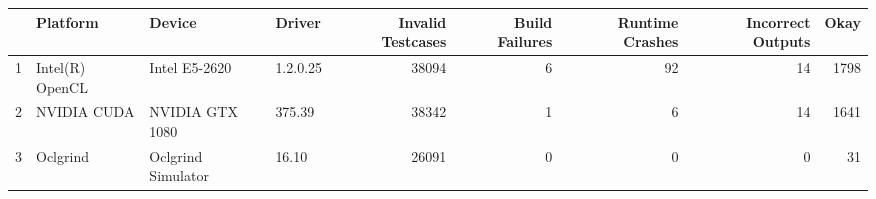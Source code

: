 \begin{tabular}{llllrrrrr}
\toprule
{} &         Platform &              Device &    Driver &  Invalid Testcases &  Build Failures &  Runtime Crashes &  Incorrect Outputs &  Okay \\
\midrule
1 &  Intel(R) OpenCL &       Intel E5-2620 &  1.2.0.25 &              38094 &               6 &               92 &                 14 &  1798 \\
2 &      NVIDIA CUDA &     NVIDIA GTX 1080 &    375.39 &              38342 &               1 &                6 &                 14 &  1641 \\
3 &         Oclgrind &  Oclgrind Simulator &     16.10 &              26091 &               0 &                0 &                  0 &    31 \\
\bottomrule
\end{tabular}
